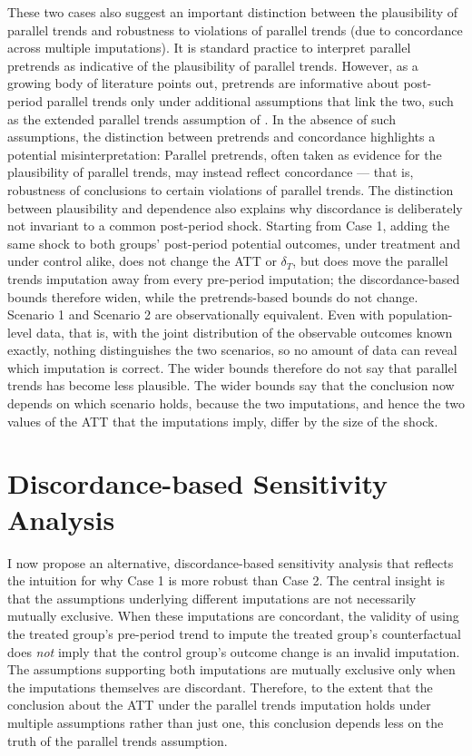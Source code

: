 \documentclass[twoside,11pt]{article}
\begin{document}
These two cases also suggest an important distinction between the plausibility of parallel trends and robustness to violations of parallel trends (due to concordance across multiple imputations). It is standard practice to interpret parallel pretrends as indicative of the plausibility of parallel trends. However, as a growing body of literature \citep{kahn-langlang2020,rothsantanna2023,egamiyamauchi2023} points out, pretrends are informative about post-period parallel trends only under additional assumptions that link the two, such as the extended parallel trends assumption of \citet{egamiyamauchi2023}. In the absence of such assumptions, the distinction between pretrends and concordance highlights a potential misinterpretation: Parallel pretrends, often taken as evidence for the plausibility of parallel trends, may instead reflect concordance --- that is, robustness of conclusions to certain violations of parallel trends. The distinction between plausibility and dependence also explains why discordance is deliberately not invariant to a common post-period shock. Starting from Case 1, adding the same shock to both groups' post-period potential outcomes, under treatment and under control alike, does not change the \textrm{ATT} or $\delta_T$, but does move the parallel trends imputation away from every pre-period imputation; the discordance-based bounds therefore widen, while the pretrends-based bounds do not change. Scenario 1 and Scenario 2 are observationally equivalent. Even with population-level data, that is, with the joint distribution of the observable outcomes known exactly, nothing distinguishes the two scenarios, so no amount of data can reveal which imputation is correct. The wider bounds therefore do not say that parallel trends has become less plausible. The wider bounds say that the conclusion now depends on which scenario holds, because the two imputations, and hence the two values of the \textrm{ATT} that the imputations imply, differ by the size of the shock.

\section{Discordance-based Sensitivity Analysis} \label{sec: discordance-based model}

I now propose an alternative, discordance-based sensitivity analysis that reflects the intuition for why Case 1 is more robust than Case 2. The central insight is that the assumptions underlying different imputations are not necessarily mutually exclusive. When these imputations are concordant, the validity of using the treated group's pre-period trend to impute the treated group's counterfactual does \textit{not} imply that the control group's outcome change is an invalid imputation. The assumptions supporting both imputations are mutually exclusive only when the imputations themselves are discordant. Therefore, to the extent that the conclusion about the \textrm{ATT} under the parallel trends imputation holds under multiple assumptions rather than just one, this conclusion depends less on the truth of the parallel trends assumption.
\end{document}
